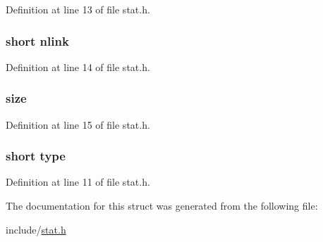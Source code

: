 Definition at line 13 of file stat.\-h.

\hypertarget{structstat_aa7e1ed70907ed9a2fc9c9a7c24cd0d4d}{
\subsubsection[{nlink}]{\setlength{\rightskip}{0pt plus 5cm}short nlink}}\label{structstat_aa7e1ed70907ed9a2fc9c9a7c24cd0d4d}


Definition at line 14 of file stat.\-h.

\hypertarget{structstat_a22d26304a3b3aca97e6311f6939dd1bf}{
\subsubsection[{size}]{ size}}\label{structstat_a22d26304a3b3aca97e6311f6939dd1bf}


Definition at line 15 of file stat.\-h.

\hypertarget{structstat_acd579dfd50a9ea905ca697ed8707bf3b}{
\subsubsection[{type}]{\setlength{\rightskip}{0pt plus 5cm}short type}}\label{structstat_acd579dfd50a9ea905ca697ed8707bf3b}


Definition at line 11 of file stat.\-h.



The documentation for this struct was generated from the following file\-:\begin{DoxyCompactItemize}
\item 
include/\hyperlink{stat_8h}{stat.\-h}\end{DoxyCompactItemize}
